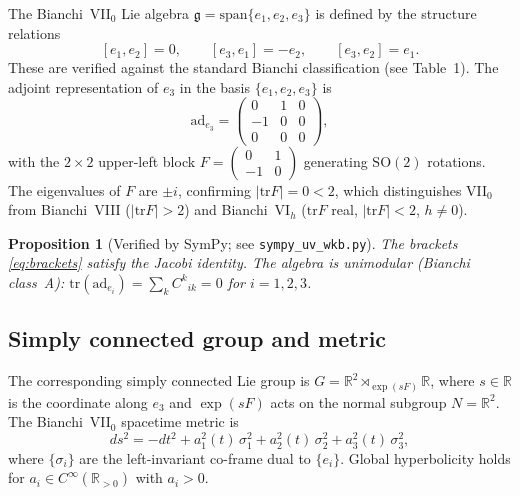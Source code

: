 \documentclass[12pt, a4paper]{article}
\newtheorem{proposition}[theorem]{Proposition}
\theoremstyle{remark}
\newcommand{\bR}{\mathbb{R}}
\newcommand{\tr}{\mathrm{tr}}
\newcommand{\semidp}{\rtimes}
\newcommand{\Lie}{\mathfrak{g}}
\newcommand{\ad}{\mathrm{ad}}
\begin{document}
The Bianchi~VII$_0$ Lie algebra $\Lie = \mathrm{span}\{e_1, e_2, e_3\}$ is
defined by the structure relations
\begin{equation}\label{eq:brackets}
  [e_1, e_2] = 0, \qquad [e_3, e_1] = -e_2, \qquad [e_3, e_2] = e_1.
\end{equation}
These are verified against the standard Bianchi classification (see
\cite{AV13} Table~1).
The adjoint representation of $e_3$ in the basis $\{e_1,e_2,e_3\}$ is
\begin{equation}\label{eq:ad3}
  \ad_{e_3} = \begin{pmatrix} 0 & 1 & 0 \\ -1 & 0 & 0 \\ 0 & 0 & 0 \end{pmatrix},
\end{equation}
with the $2\times 2$ upper-left block $F = \begin{pmatrix}0&1\\-1&0\end{pmatrix}$
generating $\mathrm{SO}(2)$ rotations.
The eigenvalues of $F$ are $\pm i$, confirming $|\tr F| = 0 < 2$, which
distinguishes VII$_0$ from Bianchi~VIII ($|\tr F| > 2$) and Bianchi~VI$_h$
($\tr F$ real, $|\tr F| < 2$, $h\neq 0$).

\begin{proposition}[Verified by SymPy; see \texttt{sympy\_uv\_wkb.py}]
  \label{prop:structure}
  The brackets \eqref{eq:brackets} satisfy the Jacobi identity.
  The algebra is \emph{unimodular} (Bianchi class~A):
  $\tr(\ad_{e_i}) = \sum_k C^k{}_{ik} = 0$ for $i=1,2,3$.
\end{proposition}

\subsection{Simply connected group and metric}

The corresponding simply connected Lie group is
$G = \bR^2 \semidp_{\exp(sF)} \bR$, where $s \in \bR$ is the coordinate
along $e_3$ and $\exp(sF)$ acts on the normal subgroup $N = \bR^2$.
The Bianchi~VII$_0$ spacetime metric is
\begin{equation}\label{eq:metric}
  ds^2 = -dt^2 + a_1^2(t)\,\sigma_1^2 + a_2^2(t)\,\sigma_2^2
          + a_3^2(t)\,\sigma_3^2,
\end{equation}
where $\{\sigma_i\}$ are the left-invariant co-frame dual to $\{e_i\}$.
Global hyperbolicity holds for $a_i \in C^\infty(\bR_{>0})$ with $a_i > 0$.
\end{document}
